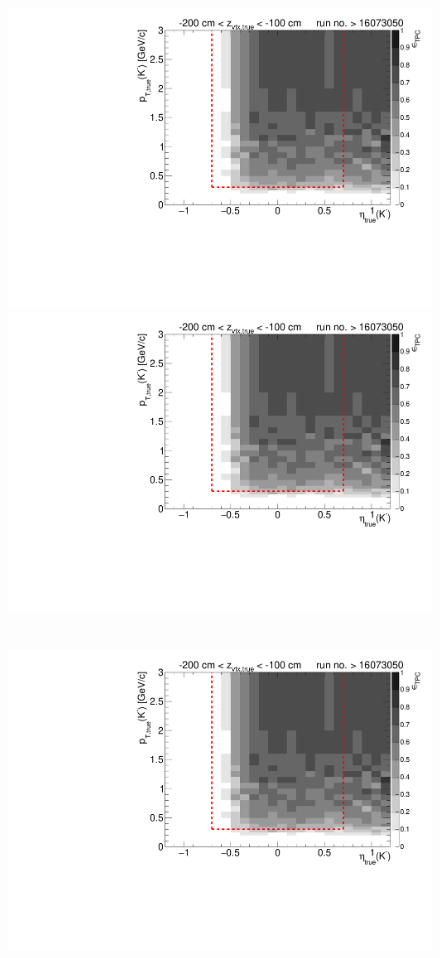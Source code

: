 \begin{figure}[hb]
{		\includegraphics[width=\linewidth,page=7]{graphics/eff/Eff2D_TPC_kaon_Minus_RunRange2.pdf}\\
		\includegraphics[width=\linewidth,page=9]{graphics/eff/Eff2D_TPC_kaon_Minus_RunRange2.pdf}
	}~
	\parbox{0.495\textwidth}{
		\centering
		\includegraphics[width=\linewidth,page=4]{graphics/eff/Eff2D_TPC_kaon_Minus_RunRange2.pdf}\\
}
\end{figure}
